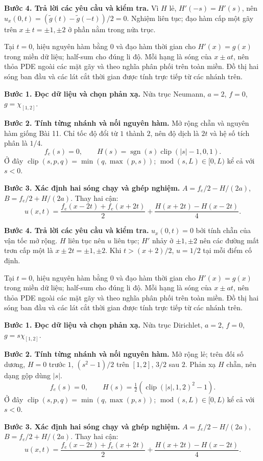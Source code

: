 \textbf{Bước 4. Trả lời các yêu cầu và kiểm tra.} Vì $H$ lẻ, $H'(-s)=H'(s)$, nên $u_x(0,t)=(\widetilde g(t)-\widetilde g(-t))/2=0$. Nghiệm liên tục; đạo hàm cấp một gãy trên $x\pm t=\pm1,\pm2$ ở phần nằm trong nửa trục.

Tại $t=0$, hiệu nguyên hàm bằng $0$ và đạo hàm thời gian cho $H'(x)=g(x)$ trong miền dữ liệu; half-sum cho đúng li độ. Mỗi hạng là sóng của $x\pm at$, nên thỏa PDE ngoài các mặt gãy và theo nghĩa phân phối trên toàn miền. Đồ thị hai sóng ban đầu và các lát cắt thời gian được tính trực tiếp từ các nhánh trên.

\textbf{Bước 1. Đọc dữ liệu và chọn phản xạ.} Nửa trục Neumann, $a=2$, $f=0$, $g=\chi_{[1,2]}$.

\textbf{Bước 2. Tính từng nhánh và nối nguyên hàm.} Mở rộng chẵn và nguyên hàm giống Bài 11. Chỉ tốc độ đổi từ $1$ thành $2$, nên độ dịch là $2t$ và hệ số tích phân là $1/4$.
\[f_e(s)=0,\qquad H(s)=\operatorname{sgn}(s)\operatorname{clip}(|s|-1,0,1).\]
Ở đây $\operatorname{clip}(s,p,q)=\min(q,\max(p,s))$; $\operatorname{mod}(s,L)\in[0,L)$ kể cả với $s<0$.

\textbf{Bước 3. Xác định hai sóng chạy và ghép nghiệm.} $A=f_e/2-H/(2a)$, $B=f_e/2+H/(2a)$. Thay hai cận:
\[u(x,t)=\frac{f_e(x-2t)+f_e(x+2t)}2+\frac{H(x+2t)-H(x-2t)}{4}.\]

\textbf{Bước 4. Trả lời các yêu cầu và kiểm tra.} $u_x(0,t)=0$ bởi tính chẵn của vận tốc mở rộng. $H$ liên tục nên $u$ liên tục; $H'$ nhảy ở $\pm1,\pm2$ nên các đường mất trơn cấp một là $x\pm2t=\pm1,\pm2$. Khi $t>(x+2)/2$, $u=1/2$ tại mỗi điểm cố định.

Tại $t=0$, hiệu nguyên hàm bằng $0$ và đạo hàm thời gian cho $H'(x)=g(x)$ trong miền dữ liệu; half-sum cho đúng li độ. Mỗi hạng là sóng của $x\pm at$, nên thỏa PDE ngoài các mặt gãy và theo nghĩa phân phối trên toàn miền. Đồ thị hai sóng ban đầu và các lát cắt thời gian được tính trực tiếp từ các nhánh trên.

\textbf{Bước 1. Đọc dữ liệu và chọn phản xạ.} Nửa trục Dirichlet, $a=2$, $f=0$, $g=s\chi_{[1,2]}$.

\textbf{Bước 2. Tính từng nhánh và nối nguyên hàm.} Mở rộng lẻ; trên đối số dương, $H=0$ trước $1$, $(s^2-1)/2$ trên $[1,2]$, $3/2$ sau $2$. Phản xạ $H$ chẵn, nên dạng gộp dùng $|s|$.
\[f_e(s)=0,\qquad H(s)=\tfrac12(\operatorname{clip}(|s|,1,2)^2-1).\]
Ở đây $\operatorname{clip}(s,p,q)=\min(q,\max(p,s))$; $\operatorname{mod}(s,L)\in[0,L)$ kể cả với $s<0$.

\textbf{Bước 3. Xác định hai sóng chạy và ghép nghiệm.} $A=f_e/2-H/(2a)$, $B=f_e/2+H/(2a)$. Thay hai cận:
\[u(x,t)=\frac{f_e(x-2t)+f_e(x+2t)}2+\frac{H(x+2t)-H(x-2t)}{4}.\]

